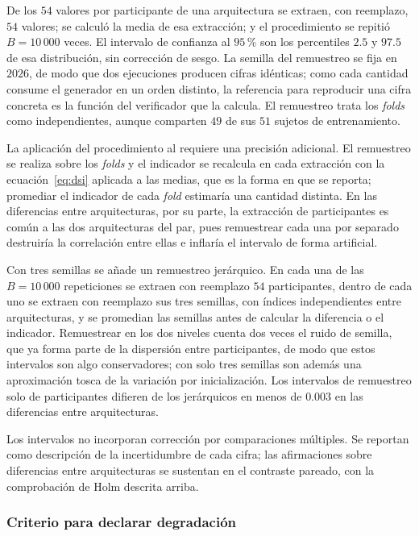 De los $54$ valores por participante de una arquitectura se extraen, con reemplazo, $54$
valores; se calculó la media de esa extracción; y el procedimiento se repitió
$B = 10\,000$ veces. El intervalo de confianza al $95$\,\% son los percentiles $2.5$ y
$97.5$ de esa distribución, sin corrección de sesgo. La semilla del remuestreo se fija en
$2026$, de modo que dos ejecuciones producen cifras idénticas; como cada cantidad consume
el generador en un orden distinto, la referencia para reproducir una cifra concreta es la
función del verificador que la calcula. El remuestreo trata los \textit{folds} \loso{} como
independientes, aunque comparten $49$ de sus $51$ sujetos de entrenamiento.

La aplicación del procedimiento al \dsi{} requiere una precisión adicional. El remuestreo
se realiza sobre los \textit{folds} y el indicador se recalcula en cada extracción con la
ecuación~\eqref{eq:dsi} aplicada a las medias, que es la forma en que se reporta; promediar
el indicador de cada \textit{fold} estimaría una cantidad distinta. En las diferencias
entre arquitecturas, por su parte, la extracción de participantes es común a las dos
arquitecturas del par, pues remuestrear cada una por separado destruiría la correlación
entre ellas e inflaría el intervalo de forma artificial.

Con tres semillas se añade un remuestreo jerárquico. En cada una de las $B = 10\,000$ repeticiones
se extraen con reemplazo $54$ participantes, dentro de cada uno se extraen con reemplazo sus tres
semillas, con índices independientes entre arquitecturas, y se promedian las semillas antes de
calcular la diferencia o el indicador. Remuestrear en los dos niveles cuenta dos veces el ruido de
semilla, que ya forma parte de la dispersión entre participantes, de modo que estos intervalos son
algo conservadores; con solo tres semillas son además una aproximación tosca de la variación por
inicialización. Los intervalos de remuestreo solo de participantes difieren de los jerárquicos en
menos de $0.003$ en las diferencias entre arquitecturas.

Los intervalos no incorporan corrección por comparaciones múltiples. Se reportan como
descripción de la incertidumbre de cada cifra; las afirmaciones sobre diferencias entre
arquitecturas se sustentan en el contraste pareado, con la comprobación de Holm descrita
arriba.

\subsubsection{Criterio para declarar degradación}

